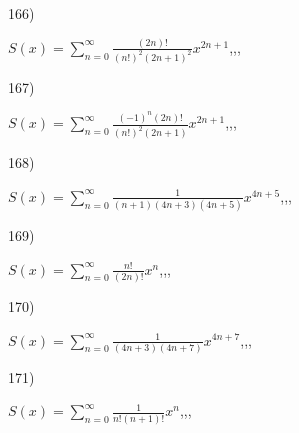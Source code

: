 \documentclass[11pt, ukrainian]{article}
\begin{document}
\par
\vspace{0.9cm}
166) \space 
{%
{$S(x)=\sum\limits_{n=0}^{\infty}{\frac{(2n)!}{{(n!)^2}{(2n+1)^2}}}{x^{{2n+1}}}$},,, \par \smallskip  
}
\par
\vspace{0.9cm}
167) \space 
{%
{$S(x)=\sum\limits_{n=0}^{\infty}{\frac{{(-1)^n}(2n)!}{(n!)^2(2n+1)}}{x^{{2n+1}}}$},,, \par \smallskip  
}
\par
\vspace{0.9cm}
168) \space 
{%
{$S(x)=\sum\limits_{n=0}^{\infty}{\frac{1}{(n+1)(4n+3)(4n+5)}}{x^{{4n+5}}}$},,, \par \smallskip  
}
\par
\vspace{0.9cm}
169) \space 
{%
{$S(x)=\sum\limits_{n=0}^{\infty}{\frac{n!}{(2n)!}}{x^{{n}}}$},,, \par \smallskip  
}
\par
\vspace{0.9cm}
170) \space 
{%
{$S(x)=\sum\limits_{n=0}^{\infty}{\frac{1}{(4n+3)(4n+7)}}{x^{{4n+7}}}$},,, \par \smallskip  
}
\par
\newpage
171) \space 
{%
{$S(x)=\sum\limits_{n=0}^{\infty}{\frac{1}{n!(n+1)!}}{x^{{n}}}$},,, \par \smallskip  
}
\end{document}
